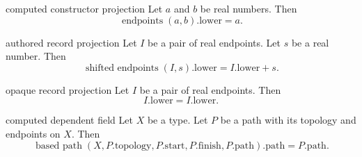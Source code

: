 \begin{cleanresult}{computed constructor projection}
Let $a$ and $b$ be real numbers.
Then \[\operatorname{endpoints}(a, b).\mathrm{lower}=a.\]
\end{cleanresult}

\begin{cleanresult}{authored record projection}
Let $I$ be a pair of real endpoints.
Let $s$ be a real number.
Then \[\operatorname{shifted\ endpoints}(I, s).\mathrm{lower}=I.\mathrm{lower}+s.\]
\end{cleanresult}

\begin{cleanresult}{opaque record projection}
Let $I$ be a pair of real endpoints.
Then \[I.\mathrm{lower}=I.\mathrm{lower}.\]
\end{cleanresult}

\begin{cleanresult}{computed dependent field}
Let $X$ be a type.
Let $P$ be a path with its topology and endpoints on $X$.
Then \[\operatorname{based\ path}(X, P.\mathrm{topology}, P.\mathrm{start}, P.\mathrm{finish}, P.\mathrm{path}).\mathrm{path}=P.\mathrm{path}.\]
\end{cleanresult}

